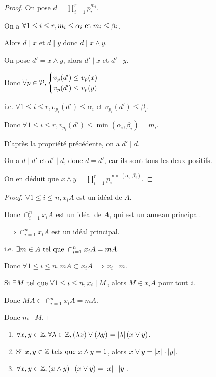 \documentclass[12pt,a4paper]{report}
\begin{document}
\begin{proof}
    On pose $d = \prod_{i=1}^r p_i^{m_i}$.

    On a $\forall 1 \le i \le r, m_i \le \alpha_i \text{ et } m_i \le \beta_i$.

    Alors $d \mid x$ et $d\mid y$ donc $d\mid x\wedge y$.

    On pose $d' = x \wedge y$, alors $d' \mid x$ et $d' \mid y$.

    Donc $\forall p \in \mathcal{P}, \begin{cases}
    v_p(d') \le v_p(x)\\
    v_p(d') \le v_p(y)
    \end{cases}$

    i.e. $\forall 1 \le i \le r, v_{p_i}(d') \le \alpha_i$ et $v_{p_i}(d') \le \beta_i$.

    Donc $\forall 1 \le i \le r, v_{p_i}(d') \le \min(\alpha_i,\beta_i) = m_i$.

    D'après la propriété précédente, on a $d' \mid d$.

    On a $d \mid d'$ et $d' \mid d$, donc $d = d'$, car ils sont tous les deux positifs.

    On en déduit que $x \wedge y = \prod_{i=1}^r p_i^{\min(\alpha_i,\beta_i)}$.
\end{proof}

\begin{proof}
    $\forall 1 \le i \le n, x_i A$ est un idéal de $A$.
    
    Donc $\cap_{i=1}^n x_i A$ est un idéal de $A$, qui est un anneau principal.

    $\implies \cap_{i=1}^n x_i A$ est un idéal principal.

    i.e. $\exists m \in A \text{ tel que } \cap_{i=1}^n x_i A = mA$.

    Donc $\forall 1 \le i \le n, mA \subset x_i A \implies x_i \mid m$.

    Si $\exists M \text{ tel que } \forall 1 \le i \le n, x_i \mid M$, alors $M \in x_i A$ pour tout $i$. 

    Donc $MA \subset \cap_{i=1}^n x_i A = mA$.

    Donc $m \mid M$.
\end{proof}

\begin{property}
    \begin{enumerate}
        \item $\forall x,y \in \mathbb{Z}, \forall \lambda \in \mathbb{Z}, (\lambda x) \vee (\lambda y) = \left|\lambda\right| (x \vee y)$.
        \item Si $x,y \in \mathbb{Z} \text{ tels que } x \wedge y = 1$, alors $x \vee y = \left|x\right|\cdot\left|y\right|$.
        \item $\forall x,y\in\mathbb{Z}, (x \wedge y) \cdot (x \vee y) = \left|x\right|\cdot\left|y\right|$.
    \end{enumerate}
\end{property}
\end{document}
